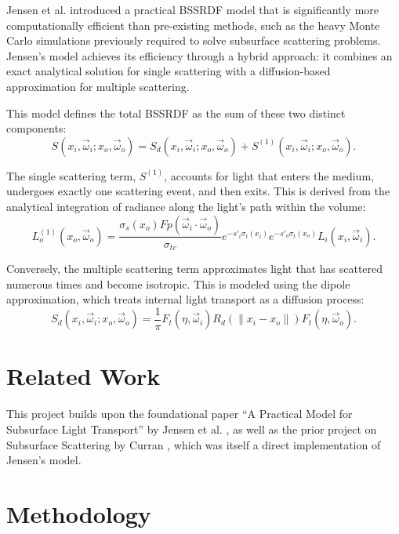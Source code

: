 \documentclass[sigconf,nonacm]{acmart}
\begin{document}
Jensen et al. \cite{jensen2001practical} introduced a practical BSSRDF model that is significantly more computationally efficient than pre-existing methods, such as the heavy Monte Carlo simulations previously required to solve subsurface scattering problems. Jensen's model achieves its efficiency through a hybrid approach: it combines an exact analytical solution for single scattering with a diffusion-based approximation for multiple scattering.

This model defines the total BSSRDF as the sum of these two distinct components:
\begin{equation}
    S(x_i, \vec{\omega}_i; x_o, \vec{\omega}_o) = S_d(x_i, \vec{\omega}_i; x_o, \vec{\omega}_o) + S^{(1)}(x_i, \vec{\omega}_i; x_o, \vec{\omega}_o).
\end{equation}

The single scattering term, $S^{(1)}$, accounts for light that enters the medium, undergoes exactly one scattering event, and then exits. This is derived from the analytical integration of radiance along the light's path within the volume:
\begin{equation}
    L_o^{(1)}(x_o, \vec{\omega}_o) = \frac{\sigma_s(x_o) F p(\vec{\omega}_i \cdot \vec{\omega}_o)}{\sigma_{tc}} e^{-s'_i \sigma_t(x_i)} e^{-s'_o \sigma_t(x_o)} L_i(x_i, \vec{\omega}_i).
\end{equation}

Conversely, the multiple scattering term approximates light that has scattered numerous times and become isotropic. This is modeled using the dipole approximation, which treats internal light transport as a diffusion process:
\begin{equation}
    S_d(x_i, \vec{\omega}_i; x_o, \vec{\omega}_o) = \frac{1}{\pi} F_t(\eta, \vec{\omega}_i) R_d(\|x_i - x_o\|) F_t(\eta, \vec{\omega}_o).
\end{equation}

\section{Related Work}

This project builds upon the foundational paper ``A Practical Model for Subsurface Light Transport'' by Jensen et al. \cite{jensen2001practical}, as well as the prior project on Subsurface Scattering by Curran \cite{curranmax2013subsurface}, which was itself a direct implementation of Jensen's model.

\section{Methodology}
\end{document}
